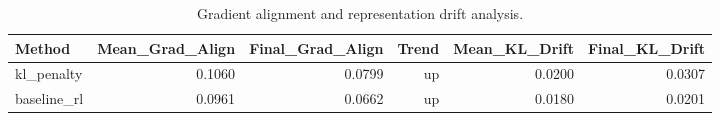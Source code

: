 \begin{table}[htbp]
\centering
\caption{Gradient alignment and representation drift analysis.}
\label{tab:gradient}
\begin{tabular}{lrrrrr}
\toprule
\textbf{Method} & \textbf{Mean_Grad_Align} & \textbf{Final_Grad_Align} & \textbf{Trend} & \textbf{Mean_KL_Drift} & \textbf{Final_KL_Drift} \\
\midrule
kl_penalty & 0.1060 & 0.0799 & up & 0.0200 & 0.0307 \\
baseline_rl & 0.0961 & 0.0662 & up & 0.0180 & 0.0201 \\
\bottomrule
\end{tabular}
\end{table}